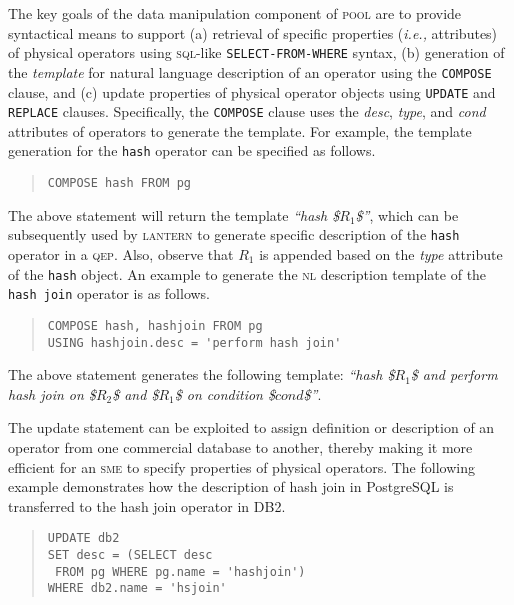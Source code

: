 \documentclass[11pt]{article}
\newcommand{\ie}{\emph{i.e.,}\xspace}
\begin{document}
The key goals of the data manipulation component of \textsc{pool} are to provide syntactical means to support (a) retrieval of specific properties (\ie attributes) of physical operators using \textsc{sql}-like \texttt{SELECT-FROM-WHERE} syntax, (b) generation of the \textit{template} for natural language description of  an operator using the \texttt{COMPOSE} clause, and (c) update properties of physical operator objects using  \texttt{UPDATE} and \texttt{REPLACE} clauses. Specifically, the \texttt{COMPOSE} clause uses the \textit{desc}, \textit{type}, and \textit{cond} attributes of operators to generate the template. For example, the template generation for the \texttt{hash} operator can be specified as follows.
\begin{quote}
\begin{verbatim}
COMPOSE hash FROM pg
\end{verbatim}
\end{quote}

The above statement will return the template \textit{``hash \$$R_1$\$''}, which can be subsequently used by \textsc{lantern} to generate specific description of the \texttt{hash} operator in a \textsc{qep}. Also, observe that $R_1$ is appended based on the \textit{type} attribute of the \texttt{hash} object. An example to generate the \textsc{nl} description template of the \texttt{hash join} operator is as follows.
\begin{quote}
\begin{verbatim}
COMPOSE hash, hashjoin FROM pg
USING hashjoin.desc = 'perform hash join'
\end{verbatim}
\end{quote}
The above statement generates the following template: \textit{``hash \$$R_1$\$ and perform hash join on \$$R_2$\$ and \$$R_1$\$ on condition \$$cond$\$''}. 

The update statement can be exploited to assign definition or description of an operator from one commercial database to another, thereby making it more efficient for an \textsc{sme} to specify properties of physical operators. The following example demonstrates how the description of hash join in PostgreSQL is transferred to the hash join operator in DB2.

\begin{quote}
\begin{verbatim}
UPDATE db2
SET desc = (SELECT desc
 FROM pg WHERE pg.name = 'hashjoin')
WHERE db2.name = 'hsjoin'
\end{verbatim}
\end{quote}
\end{document}
